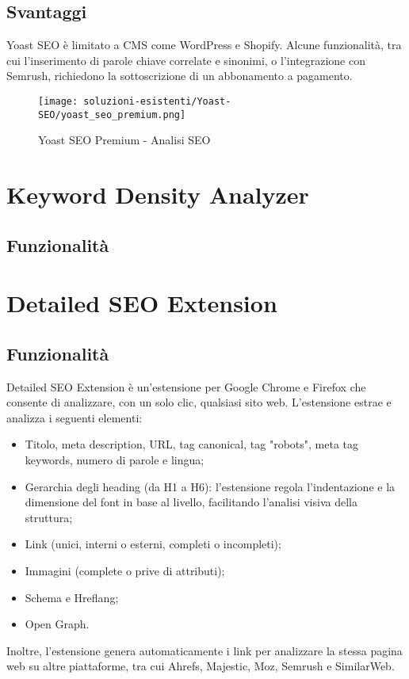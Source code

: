 \subsection{Svantaggi}
\par Yoast SEO è limitato a CMS come WordPress e Shopify. Alcune funzionalità, tra cui l’inserimento di parole chiave correlate e sinonimi, o l'integrazione con Semrush, richiedono la sottoscrizione di un abbonamento a pagamento.

\begin{figure}[H]
    \centering 
    \texttt{[image: soluzioni-esistenti/Yoast-SEO/yoast\_seo\_premium.png]} 
    \caption{Yoast SEO Premium - Analisi SEO}
\end{figure}

\section{Keyword Density Analyzer}

\subsection{Funzionalità}
\par 

\section{Detailed SEO Extension}

\subsection{Funzionalità}
\par Detailed SEO Extension è un’estensione per Google Chrome e Firefox che consente di analizzare, con un solo clic, qualsiasi sito web. L’estensione estrae e analizza i seguenti elementi:
\begin{itemize}
    \item Titolo, meta description, URL, tag canonical, tag "robots", meta tag keywords, numero di parole e lingua;
    \item Gerarchia degli heading (da H1 a H6): l'estensione regola l'indentazione e la dimensione del font in base al livello, facilitando l'analisi visiva della struttura;
    \item Link (unici, interni o esterni, completi o incompleti);
    \item Immagini (complete o prive di attributi);
    \item Schema e Hreflang;
    \item Open Graph.
\end{itemize}
\par Inoltre, l'estensione genera automaticamente i link per analizzare la stessa pagina web su altre piattaforme, tra cui Ahrefs, Majestic, Moz, Semrush e SimilarWeb.

